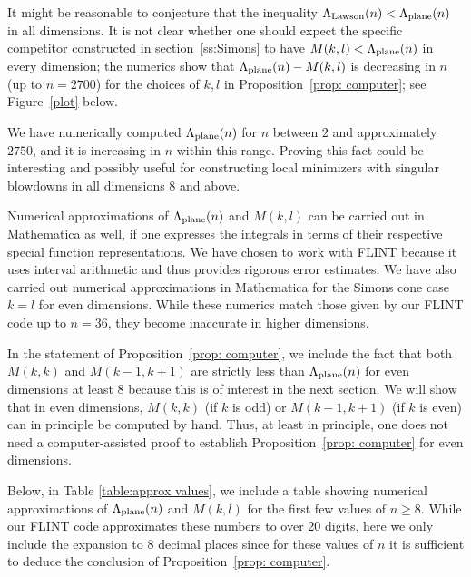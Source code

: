 \documentclass[10pt,reqno]{amsart}
\numberwithin{equation}{section}
\theoremstyle{definition}
\newtheorem{remark}[theorem]{Remark}
\begin{document}
{{It might be reasonable to conjecture that the inequality  $\Lambda_{\rm Lawson}(n)< \Lambda_{\rm plane}(n)$ in all dimensions. It is not clear whether one should expect the specific competitor constructed in section~\ref{ss:Simons} to have $M(k,l) < \Lambda_{\rm plane }(n)$ in every dimension; the numerics show that $\Lambda_{\rm plane }(n) - M(k,l)$ is decreasing in $n$ (up to $n=2700$) for the choices of $k,l$ in Proposition~\ref{prop: computer}; see Figure~\ref{plot} below.

    We have numerically computed $\Lambda_{\rm plane}(n)$ for $n$ between $2$ and approximately $2750$, and it is increasing in $n$ within this range. Proving this fact could be interesting and possibly useful for constructing local minimizers with singular blowdowns in all dimensions $8$ and above.
 
Numerical approximations of $\Lambda_{\rm plane}(n)$ and $M(k,l)$ can be carried out in Mathematica as well, {if one expresses the integrals in terms of their respective special function representations}. We have chosen to work with FLINT because it uses interval arithmetic and thus provides rigorous error estimates. We have also carried out numerical approximations in Mathematica for the Simons cone case $k=l$ for even dimensions. While these numerics match those given by our FLINT code up to $n=36$, they become inaccurate in higher dimensions.

In the statement of Proposition~\ref{prop: computer}, we include the fact that both $M(k,k)$ and $M(k-1, k+1)$ are strictly less than $\Lambda_{\rm plane}(n)$ for even dimensions at least $8$  because this is of interest in the next section. We will show that in even dimensions, $M(k,k)$ (if $k$ is odd) or $M(k-1,k+1)$ (if $k$ is even) can in principle be computed by hand. Thus, at least in principle, one does not need a computer-assisted proof to establish Proposition~\ref{prop: computer} for even dimensions.

Below, in Table \ref{table:approx values}, we include a table showing numerical approximations of $\Lambda_{\rm plane}(n)$ and $M(k,l)$ for {the first few} values of $n \geq 8$. While our FLINT code approximates these numbers to over 20 digits, here we only include the expansion to 8 decimal places since for these values of $n$ it is sufficient to deduce the conclusion of Proposition~\ref{prop: computer}.





}}
\end{document}
